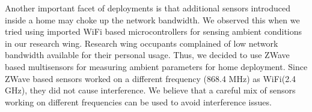 \documentclass[10pt]{sensys-proc}
\begin{document}
\noindent Another important facet of deployments is that additional sensors introduced inside a home may choke up the network bandwidth. We observed this when we tried using imported WiFi based microcontrollers for sensing ambient conditions in our research wing. Research wing occupants complained of low network bandwidth available for their personal usage. Thus, we decided to use ZWave based multisensors for measuring ambient parameters for home deployment. Since ZWave based sensors worked on a different frequency (868.4 MHz) as WiFi(2.4 GHz), they did not cause interference. We believe that a careful mix of sensors working on different frequencies can be used to avoid interference issues.

\begin{figure}[t!]  
    \hspace{1mm}

\end{figure}
\end{document}
